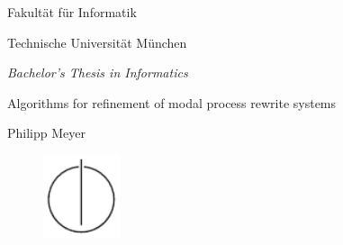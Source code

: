 \thispagestyle{empty}
\begin{titlepage}
  \begin{center}
    \begin{figure}[htp]
      \centering
      \oTUM{6cm}
    \end{figure}

    \vspace*{2\baselineskip}
    
    {\large{\scfont Fakultät für Informatik}}
    
    {\large {\scfont Technische Universität München}}
    
    \vspace{1.5cm}
    
    {\large \em Bachelor's Thesis in Informatics}

    {\huge Algorithms for refinement of modal process rewrite systems}

    \vspace{2.5cm}
    
    \large{Philipp Meyer}
    
    \vspace{3.0cm}
    
    \begin{figure}[htp]
      \centering
      \includegraphics[width=0.20\textwidth]{IN_schwarz_CMYK.pdf}
    \end{figure}
  
  \end{center}
\end{titlepage}

